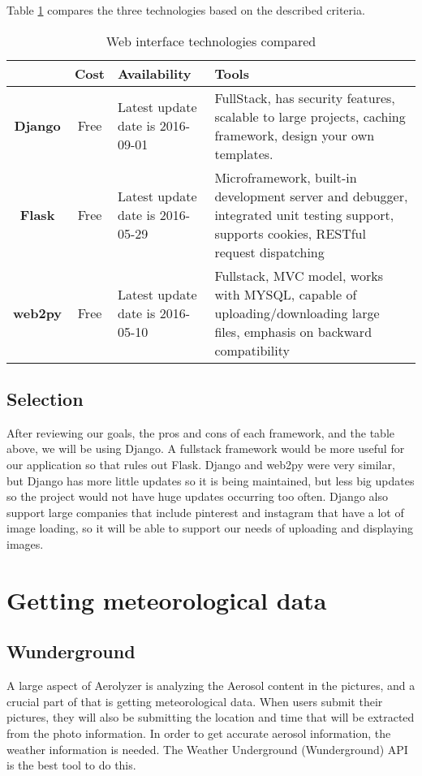 \documentclass[letterpaper,10pt,draftclsnofoot,onecolumn]{IEEEtran}
\begin{document}
\begin{flushleft}
\medskip


Table \ref{table:3} compares the three technologies based on the described criteria. \cite{13} 
\begin{table}[h!]
\caption{Web interface technologies compared}\label{table:3}
\centering
	\begin{tabular}{| c | c |  p{5cm}  |  p{5cm}  |} 
		\hline
		 & Cost & Availability &Tools\\ [0.5ex] 
		\hline
		\textbf{Django} & Free & Latest update date is 2016-09-01 & FullStack, has security features, scalable to large projects, caching framework, design your own templates. \\ 
		\hline
		\textbf{Flask} & Free &  Latest update date is 2016-05-29 & Microframework, built-in development server and debugger, integrated unit testing support, supports cookies, RESTful request dispatching  \\
		\hline
		\textbf{web2py} & Free & Latest update date is 2016-05-10 & Fullstack, MVC model, works with MYSQL, capable of uploading/downloading large files, emphasis on backward compatibility\\
		\hline
	\end{tabular}
\end{table}





\subsection{Selection}
After reviewing our goals, the pros and cons of each framework, and the table above, we will be using Django. A fullstack framework would be more useful for our application so that rules out Flask. Django and web2py were very similar, but Django has more little updates so it is being maintained, but less big updates so the project would not have huge updates occurring too often. Django also support large companies that include pinterest and instagram that have a lot of image loading, so it will be able to support our needs of uploading and displaying images.


\section{Getting meteorological data}

\subsection{Wunderground}
A large aspect of Aerolyzer is analyzing the Aerosol content in the pictures, and a crucial part of that is getting meteorological data. When users submit their pictures, they will also be submitting the location and time that will be extracted from the photo information. In order to get accurate aerosol information, the weather information is needed. The Weather Underground (Wunderground) API is the best tool to do this.




\end{flushleft}
\end{document}
